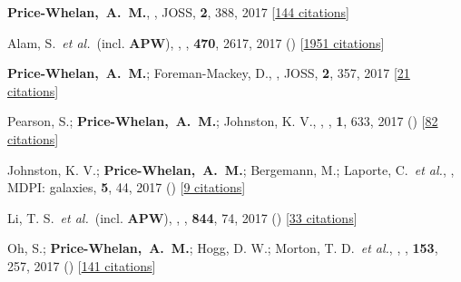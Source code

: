 \item[{\color{deemph}\scriptsize32}]\textbf{Price-Whelan,~A.~M.}, , JOSS, \textbf{2}, 388, 2017 [\href{http://adsabs.harvard.edu/abs/2017JOSS....2..388P}{144 citations}]

\item[{\color{deemph}\scriptsize31}]Alam, S.~\textit{et al.}~(incl. \textbf{APW}), , \mnras, \textbf{470}, 2617, 2017 () [\href{http://adsabs.harvard.edu/abs/2017MNRAS.470.2617A}{1951 citations}]

\item[{\color{deemph}\scriptsize30}]\textbf{Price-Whelan,~A.~M.}; Foreman-Mackey, D., , JOSS, \textbf{2}, 357, 2017 [\href{http://adsabs.harvard.edu/abs/2017JOSS....2..357P}{21 citations}]

\item[{\color{deemph}\scriptsize29}]Pearson, S.; \textbf{Price-Whelan,~A.~M.}; Johnston, K. V., , \natureast, \textbf{1}, 633, 2017 () [\href{http://adsabs.harvard.edu/abs/2017NatAs...1..633P}{82 citations}]

\item[{\color{deemph}\scriptsize28}]Johnston, K. V.; \textbf{Price-Whelan,~A.~M.}; Bergemann, M.; Laporte, C.~\textit{et al.}, , MDPI: galaxies, \textbf{5}, 44, 2017 () [\href{http://adsabs.harvard.edu/abs/2017Galax...5...44J}{9 citations}]

\item[{\color{deemph}\scriptsize27}]Li, T. S.~\textit{et al.}~(incl. \textbf{APW}), , \apj, \textbf{844}, 74, 2017 () [\href{http://adsabs.harvard.edu/abs/2017ApJ...844...74L}{33 citations}]

\item[{\color{deemph}\scriptsize26}]Oh, S.; \textbf{Price-Whelan,~A.~M.}; Hogg, D. W.; Morton, T. D.~\textit{et al.}, , \aj, \textbf{153}, 257, 2017 () [\href{http://adsabs.harvard.edu/abs/2017AJ....153..257O}{141 citations}]

